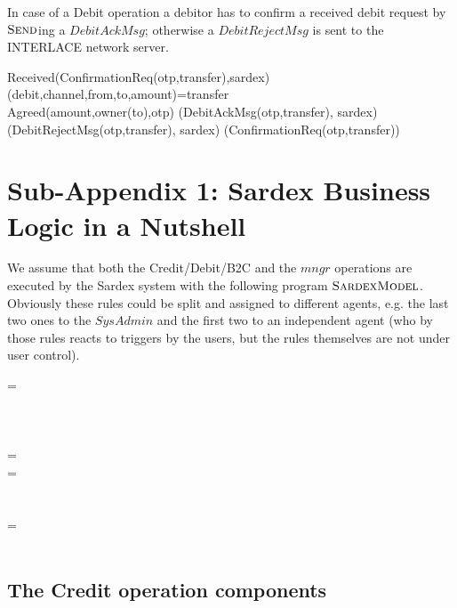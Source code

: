 In case of a Debit operation a debitor has to confirm a received debit request by $\hbox{\sc Send}$ing a $DebitAckMsg$; otherwise a $DebitRejectMsg$ is sent to the INTERLACE network server.
\begin{asm}
\IF Received(ConfirmationReq(otp,transfer),\FROM sardex) \THEN \+
\LET (debit,channel,from,to,amount)=transfer \\
\IF Agreed(amount,owner(to),otp) \THEN\+
(DebitAckMsg(otp,transfer), \TO sardex) \-
\ELSE ~ (DebitRejectMsg(otp,transfer), \TO sardex)\-
(ConfirmationReq(otp,transfer))
\end{asm}


\section{Sub-Appendix 1: Sardex Business Logic in a Nutshell}
\label{sect:appendixModel}

We assume that both the Credit/Debit/B2C and the $mngr$ operations are executed by the Sardex system with the following program $\hbox{\sc SardexModel}$. Obviously these rules could be split and assigned to different agents, e.g. the last two ones to the $SysAdmin$ and the first two to an independent agent (who by those rules reacts to triggers by the users, but the rules themselves are not under user control).

\begin{asm}
 =\+
  \\
  \\
  \\
  \\
   \-
\WHERE \+
  =\+
      \\
      \-
  =\+
      \\
      \\
     \\
     \-
   =\+    
     	\\
     	\\
 \end{asm}
 
 \subsection{The Credit operation components}
 
